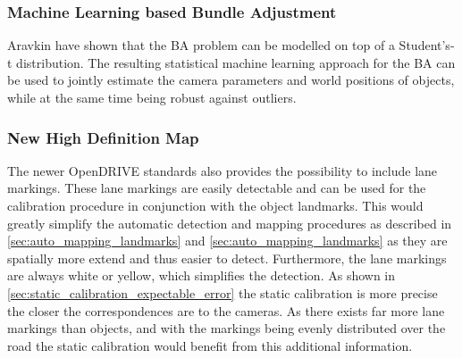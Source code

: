 \subsubsection{Machine Learning based Bundle Adjustment}
Aravkin \etal \cite{students_t_bundle_adjustment} have shown that the BA problem can be modelled on top of a Student's-t distribution. 
The resulting statistical machine learning approach for the BA can be used to jointly estimate the camera parameters and world positions of objects, while at the same time being robust against outliers.
  
\subsubsection{New High Definition Map}
The newer OpenDRIVE standards also provides the possibility to include lane markings.
These lane markings are easily detectable and can be used for the calibration procedure in conjunction with the object landmarks.
This would greatly simplify the automatic detection and mapping procedures as described in \autoref{sec:auto_mapping_landmarks} and \autoref{sec:auto_mapping_landmarks} as they are spatially more extend and thus easier to detect.
Furthermore, the lane markings are always white or yellow, which simplifies the detection.
As shown in \autoref{sec:static_calibration_expectable_error} the static calibration is more precise the closer the correspondences are to the cameras. 
As there exists far more lane markings than objects, and with the markings being evenly distributed over the road the static calibration would benefit from this additional information.